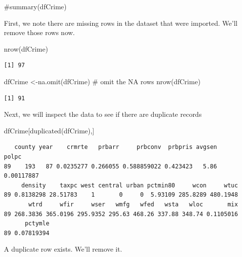 \documentclass[]{article}
\newenvironment{Shaded}{}{}
\newcommand{\CommentTok}[1]{\textcolor[rgb]{0.00,0.50,0.00}{#1}}
\newcommand{\KeywordTok}[1]{\textcolor[rgb]{0.00,0.00,1.00}{#1}}
\newcommand{\NormalTok}[1]{#1}
\begin{document}
\begin{Shaded}
\begin{Highlighting}[]
\CommentTok{#summary(dfCrime)}
\end{Highlighting}
\end{Shaded}

First, we note there are missing rows in the dataset that were imported.
We'll remove those rows now.

\begin{Shaded}
\begin{Highlighting}[]
\KeywordTok{nrow}\NormalTok{(dfCrime)}
\end{Highlighting}
\end{Shaded}

\begin{verbatim}
[1] 97
\end{verbatim}

\begin{Shaded}
\begin{Highlighting}[]
\NormalTok{dfCrime <-}\KeywordTok{na.omit}\NormalTok{(dfCrime) }\CommentTok{# omit the NA rows}
\KeywordTok{nrow}\NormalTok{(dfCrime)}
\end{Highlighting}
\end{Shaded}

\begin{verbatim}
[1] 91
\end{verbatim}

Next, we will inspect the data to see if there are duplicate records

\begin{Shaded}
\begin{Highlighting}[]
\NormalTok{dfCrime[}\KeywordTok{duplicated}\NormalTok{(dfCrime),]}
\end{Highlighting}
\end{Shaded}

\begin{verbatim}
   county year    crmrte   prbarr     prbconv  prbpris avgsen      polpc
89    193   87 0.0235277 0.266055 0.588859022 0.423423   5.86 0.00117887
     density    taxpc west central urban pctmin80     wcon     wtuc
89 0.8138298 28.51783    1       0     0  5.93109 285.8289 480.1948
       wtrd     wfir     wser   wmfg   wfed   wsta   wloc       mix
89 268.3836 365.0196 295.9352 295.63 468.26 337.88 348.74 0.1105016
      pctymle
89 0.07819394
\end{verbatim}

A duplicate row exists. We'll remove it.
\end{document}
